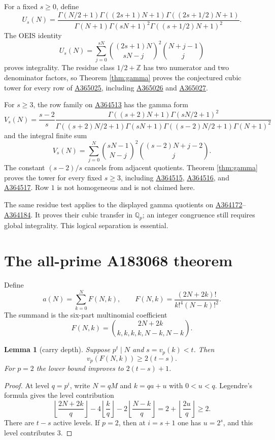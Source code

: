 \documentclass[11pt]{article}
\newtheorem{lemma}[theorem]{Lemma}
\theoremstyle{definition}
\newcommand{\Z}{\mathbb Z}
\newcommand{\Q}{\mathbb Q}
\newcommand{\OEIS}[1]{\href{https://oeis.org/#1}{#1}}
\begin{document}
For a fixed $s\geq0$, define
\[
 U_s(N)=
 \frac{\Gamma(N/2+1)\Gamma((2s+1)N+1)\Gamma((2s+1/2)N+1)}
 {\Gamma(N+1)\Gamma(sN+1)^2\Gamma((s+1/2)N+1)^2}.
\]
The OEIS identity
\[
 U_s(N)=\sum_{j=0}^{sN}\binom{(2s+1)N}{sN-j}^2
                   \binom{N+j-1}{j}
\]
proves integrality.  The residue class $1/2+\Z$ has two numerator and two
denominator factors, so Theorem \ref{thm:gamma} proves the conjectured
cubic tower for every row of \OEIS{A365025}, including \OEIS{A365026} and
\OEIS{A365027}.

For $s\geq3$, the row family on \OEIS{A364513} has the gamma form
\[
 V_s(N)=\frac{s-2}{s}
 \frac{\Gamma((s+2)N+1)\Gamma(sN/2+1)^2}
 {\Gamma((s+2)N/2+1)\Gamma(sN+1)
  \Gamma((s-2)N/2+1)\Gamma(N+1)^2}
\]
and the integral finite sum
\[
 V_s(N)=\sum_{j=0}^N\binom{sN-1}{N-j}^2
                     \binom{(s-2)N+j-2}{j}.
\]
The constant $(s-2)/s$ cancels from adjacent quotients.  Theorem
\ref{thm:gamma} proves the tower for every fixed $s\geq3$, including
\OEIS{A364515}, \OEIS{A364516}, and \OEIS{A364517}.  Row $1$ is not
homogeneous and is not claimed here.

The same residue test applies to the displayed gamma quotients on
\OEIS{A364172}--\OEIS{A364184}.  It proves their cubic transfer in $\Q_p$;
an integer congruence still requires global integrality.  This logical
separation is essential.

\section{The all-prime A183068 theorem}

Define
\[
 a(N)=\sum_{k=0}^N F(N,k),\qquad
 F(N,k)=\frac{(2N+2k)!}{k!^4(N-k)!^2}.
\]
The summand is the six-part multinomial coefficient
\[
 F(N,k)=\binom{2N+2k}{k,k,k,k,N-k,N-k}.
\]

\begin{lemma}[carry depth]\label{lem:carry}
Suppose $p^t\mid N$ and $s=v_p(k)<t$.  Then
\[
 v_p(F(N,k))\geq2(t-s).
\]
For $p=2$ the lower bound improves to $2(t-s)+1$.
\end{lemma}

\begin{proof}
At level $q=p^i$, write $N=qM$ and $k=qa+u$ with $0<u<q$.  Legendre's
formula gives the level contribution
\[
 \left\lfloor\frac{2N+2k}{q}\right\rfloor
 -4\left\lfloor\frac{k}{q}\right\rfloor
 -2\left\lfloor\frac{N-k}{q}\right\rfloor
 =2+\left\lfloor\frac{2u}{q}\right\rfloor\geq2.
\]
There are $t-s$ active levels.  If $p=2$, then at $i=s+1$ one has
$u=2^s$, and this level contributes $3$.
\end{proof}
\end{document}
